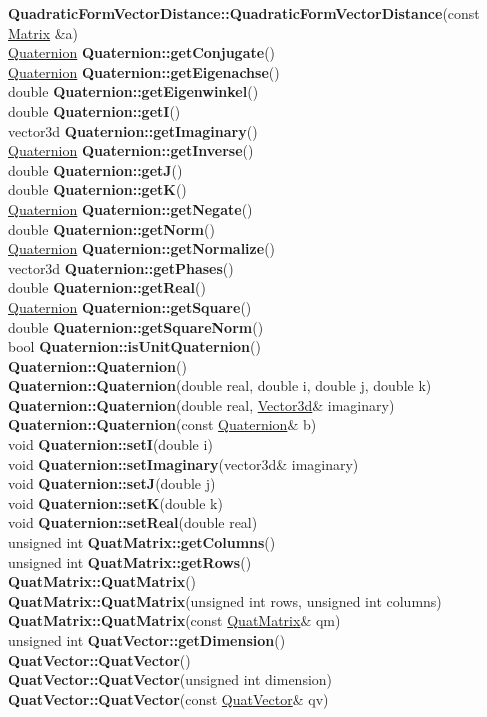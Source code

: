 \documentclass[10pt,titlepage]{article}
\def\functionlistentry#1#2#3#4#5#6{\noindent #1 {\bf #2}(#3) \dotfill #6\\}
\def\letterref#1{}
\def\letterlabelend#1{}
\begin{document}
{{\letterref{Qe}
\letterref{Qf}
\letterref{Qr}
\letterref{Qu}
\letterlabelend{Qu}
\functionlistentry{}{QuadraticFormVectorDistance::QuadraticFormVectorDistance}{const \hyperlink{Matrix}{Matrix} \&a}{1238}{features}{}
\functionlistentry{\hyperlink{Quaternion}{Quaternion}}{Quaternion::getConjugate}{}{1467}{quaternions}{}
\functionlistentry{\hyperlink{Quaternion}{Quaternion}}{Quaternion::getEigenachse}{}{1474}{quaternions}{}
\functionlistentry{double}{Quaternion::getEigenwinkel}{}{1473}{quaternions}{}
\functionlistentry{double}{Quaternion::getI}{}{1457}{quaternions}{}
\functionlistentry{vector3d}{Quaternion::getImaginary}{}{1460}{quaternions}{}
\functionlistentry{\hyperlink{Quaternion}{Quaternion}}{Quaternion::getInverse}{}{1468}{quaternions}{}
\functionlistentry{double}{Quaternion::getJ}{}{1458}{quaternions}{}
\functionlistentry{double}{Quaternion::getK}{}{1459}{quaternions}{}
\functionlistentry{\hyperlink{Quaternion}{Quaternion}}{Quaternion::getNegate}{}{1466}{quaternions}{}
\functionlistentry{double}{Quaternion::getNorm}{}{1471}{quaternions}{}
\functionlistentry{\hyperlink{Quaternion}{Quaternion}}{Quaternion::getNormalize}{}{1469}{quaternions}{}
\functionlistentry{vector3d}{Quaternion::getPhases}{}{1475}{quaternions}{}
\functionlistentry{double}{Quaternion::getReal}{}{1456}{quaternions}{}
\functionlistentry{\hyperlink{Quaternion}{Quaternion}}{Quaternion::getSquare}{}{1470}{quaternions}{}
\functionlistentry{double}{Quaternion::getSquareNorm}{}{1472}{quaternions}{}
\functionlistentry{bool}{Quaternion::isUnitQuaternion}{}{1476}{quaternions}{}
\functionlistentry{}{Quaternion::Quaternion}{}{1452}{quaternions}{}
\functionlistentry{}{Quaternion::Quaternion}{double real, double i, double j, double k}{1453}{quaternions}{}
\functionlistentry{}{Quaternion::Quaternion}{double real, \hyperlink{Vector3d}{Vector3d}\& imaginary}{1454}{quaternions}{}
\functionlistentry{}{Quaternion::Quaternion}{const \hyperlink{Quaternion}{Quaternion}\& b}{1455}{quaternions}{}
\functionlistentry{void}{Quaternion::setI}{double i}{1462}{quaternions}{}
\functionlistentry{void}{Quaternion::setImaginary}{vector3d\& imaginary}{1465}{quaternions}{}
\functionlistentry{void}{Quaternion::setJ}{double j}{1463}{quaternions}{}
\functionlistentry{void}{Quaternion::setK}{double k}{1464}{quaternions}{}
\functionlistentry{void}{Quaternion::setReal}{double real}{1461}{quaternions}{}
\functionlistentry{unsigned int}{QuatMatrix::getColumns}{}{1508}{quaternions}{}
\functionlistentry{unsigned int}{QuatMatrix::getRows}{}{1507}{quaternions}{}
\functionlistentry{}{QuatMatrix::QuatMatrix}{}{1504}{quaternions}{}
\functionlistentry{}{QuatMatrix::QuatMatrix}{unsigned int rows, unsigned int columns}{1505}{quaternions}{}
\functionlistentry{}{QuatMatrix::QuatMatrix}{const \hyperlink{QuatMatrix}{QuatMatrix}\& qm}{1506}{quaternions}{}
\functionlistentry{unsigned int}{QuatVector::getDimension}{}{1512}{quaternions}{}
\functionlistentry{}{QuatVector::QuatVector}{}{1509}{quaternions}{}
\functionlistentry{}{QuatVector::QuatVector}{unsigned int dimension}{1510}{quaternions}{}
\functionlistentry{}{QuatVector::QuatVector}{const \hyperlink{QuatVector}{QuatVector}\& qv}{1511}{quaternions}{}

}}
\end{document}
